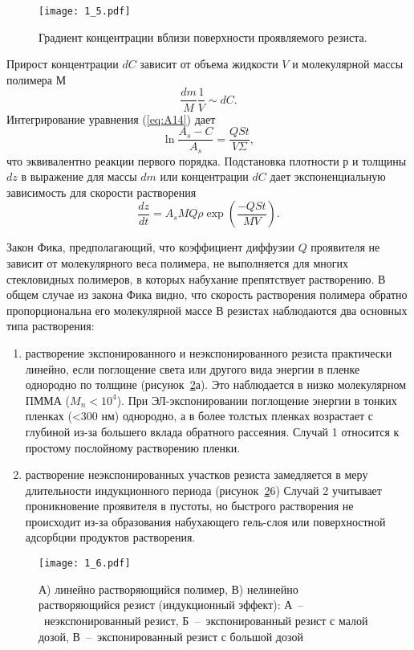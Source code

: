 \begin{figure}
\center
\texttt{[image: 1\_5.pdf]}
\caption{Градиент концентрации вблизи поверхности проявляемого резиста.}
\label{fig:5}
\end{figure}

Прирост концентрации $dC$ зависит от объема жидкости $V$ и молекулярной массы полимера $М$
\begin{equation}
\frac{dm}{M}\frac{1}{V} \sim dC.
\label{eq:A15}
\end{equation}
Интегрирование уравнения (\ref{eq:A14}) дает
\begin{equation}
\ln\frac{A_s-C}{A_s} = \frac{QSt}{V\Sigma},
\label{eq:A16}
\end{equation}
что эквивалентно реакции первого порядка. Подстановка плотности $р$ и толщины $dz$ в выражение для массы $dm$ или концентрации $dC$ дает экспоненциальную зависимость для скорости растворения
\begin{equation}
\frac{dz}{dt} = A_s MQ \rho\exp\left(\frac{-QSt}{MV}\right).
\label{eq:A17}
\end{equation}

Закон Фика, предполагающий, что коэффициент диффузии $Q$ проявителя не зависит от молекулярного веса полимера, не выполняется для многих стекловидных полимеров, в которых набухание препятствует растворению.
В общем случае из закона Фика видно, что скорость растворения полимера обратно пропорциональна его молекулярной массе В резистах наблюдаются два основных типа растворения:
\begin{enumerate}[H]
    \item растворение экспонированного и неэкспонированного резиста практически линейно, если поглощение света или другого вида энергии в пленке однородно по толщине (рисунок~\ref{fig:6}а). Это наблюдается в низко молекулярном ПММА ($M_n<10^4$). При ЭЛ-экспонировании поглощение энергии в тонких пленках (<300 нм) однородно, а в более толстых пленках возрастает с глубиной из-за большего вклада обратного рассеяния. Случай 1 относится к простому послойному растворению пленки.
    \item растворение неэкспонированных участков резиста замедляется в меру длительности индукционного периода (рисунок~\ref{fig:6}6)  Случай 2 учитывает проникновение проявителя в пустоты, но быстрого растворения не происходит из-за образования набухающего гель-слоя или поверхностной адсорбции продуктов растворения. 
\end{enumerate}
\begin{figure}
\center
\texttt{[image: 1\_6.pdf]}
\caption{А) линейно растворяющийся полимер, В) нелинейно растворяющийся резист (индукционный эффект): А~--~неэкспонированный резист, Б~--~экспонированный резист с малой дозой, В~--~экспонированный резист с большой дозой}
\label{fig:6}
\end{figure}

